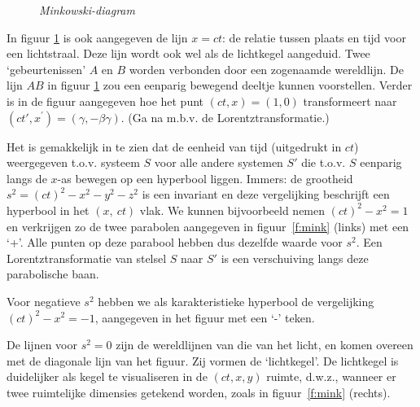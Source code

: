\begin{figure}[ht]
\centering
\caption{{\sl Minkowski-diagram}}
\label{f:conseq2}
\end{figure}


In figuur \ref{f:conseq2} is ook aangegeven de lijn $x = ct$:
de relatie tussen plaats en tijd voor een lichtstraal.
Deze lijn wordt ook wel als de lichtkegel aangeduid.
Twee `gebeurtenissen' $A$ en $B$ worden verbonden door een zogenaamde 
wereldlijn.
De lijn $AB$ in figuur \ref{f:conseq2} zou een eenparig bewegend deeltje kunnen voorstellen.
Verder is in de figuur aangegeven hoe het punt $(ct,x) = (1, 0)$ 
transformeert naar 
$(ct',x^{'}) = (\gamma,-\beta \gamma )$. 
(Ga na m.b.v. de Lorentztransformatie.)

Het is gemakkelijk in te zien dat de eenheid van tijd (uitgedrukt in
$ct$) weergegeven t.o.v. systeem $S$ voor alle andere systemen $S'$
die t.o.v. $S$ eenparig langs de $x$-as bewegen op een hyperbool
liggen.  Immers: de grootheid $s^2=(ct)^2-x^2-y^2-z^2$ is een
invariant en deze vergelijking beschrijft een hyperbool in het
$(x,\ ct)$ vlak. We kunnen bijvoorbeeld nemen $(ct)^2-x^2=1$ en
verkrijgen zo de twee parabolen aangegeven in figuur~\ref{f:mink} (links) met
een `+'. Alle punten op deze parabool hebben dus dezelfde waarde voor
$s^2$. Een Lorentztransformatie van stelsel $S$ naar $S'$ is een
verschuiving langs deze parabolische baan.

Voor negatieve $s^2$ hebben we als karakteristieke hyperbool de
vergelijking $(ct)^{2}-x^2 = -1$, aangegeven in het figuur met een `-'
teken.

De lijnen voor $s^2=0$ zijn de wereldlijnen van die van het licht, en
komen overeen met de diagonale lijn van het figuur. Zij vormen de
`lichtkegel'. De lichtkegel is duidelijker als kegel te visualiseren
in de $(ct,x,y)$ ruimte, d.w.z., wanneer er twee ruimtelijke dimensies
getekend worden, zoals in figuur~\ref{f:mink} (rechts).


